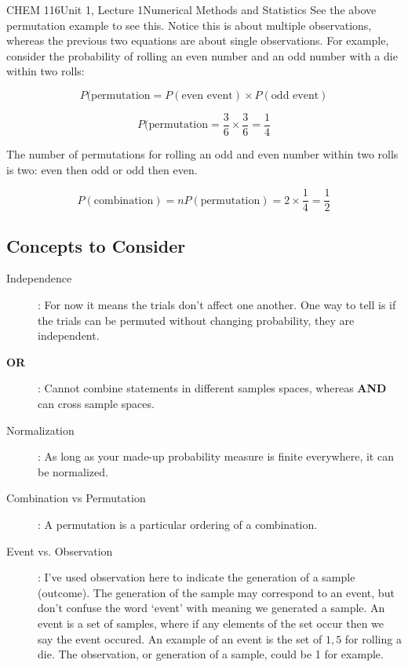 \documentclass{article}
\begin{document}
\begin{tdoc}{CHEM 116}{Unit 1, Lecture 1}{Numerical Methods and Statistics}
See the above permutation example to see this. Notice this is about multiple observations, whereas the previous two equations are about single observations. For example, consider the probability of rolling an even number and an odd number with a die within two rolls:

\begin{equation}
P(\textrm{permutation} = P(\textrm{even event}) \times P(\textrm{odd event})
\end{equation}

\begin{equation}
P(\textrm{permutation} = \frac{3}{6} \times \frac{3}{6} = \frac{1}{4}
\end{equation}

The number of permutations for rolling an odd and even number within two rolls is two: even then odd or odd then even.

\begin{equation}
P(\textrm{combination}) = n P(\textrm{permutation}) = 2 \times \frac{1}{4} = \frac{1}{2}
\end{equation}

\subsection{Concepts to Consider}

\begin{description}

\item [Independence]: For now it means the trials don't affect one
another. One way to tell is if the trials can be permuted without changing probability, they are
independent.\vspace{0.2cm}\\

\item[{\bf OR}]: Cannot combine statements in different samples spaces, whereas {\bf AND} can cross sample spaces.\vspace{0.2cm}\\

\item[Normalization]: As long as your made-up probability measure is
finite everywhere, it can be normalized.

\item[Combination vs Permutation]: A permutation is a particular
  ordering of a combination.

\item[Event vs. Observation]: I've used observation here to indicate
  the generation of a sample (outcome). The generation of the sample
  may correspond to an event, but don't confuse the word `event' with
  meaning we generated a sample. An event is a set of samples, where
  if any elements of the set occur then we say the event occured. An
  example of an event is the set of ${1,5}$ for rolling a die. The
  observation, or generation of a sample, could be 1 for example.

\end{description}

\end{tdoc}
\end{document}
